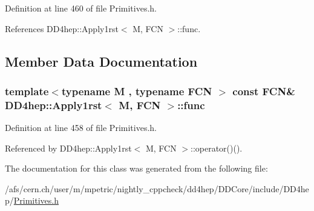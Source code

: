 Definition at line 460 of file Primitives.h.

References DD4hep::Apply1rst$<$ M, FCN $>$::func.

\subsection{Member Data Documentation}
\hypertarget{class_d_d4hep_1_1_apply1rst_a3e6269941aac554118d47927dcdeba97}{
\subsubsection[{func}]{\setlength{\rightskip}{0pt plus 5cm}template$<$typename M , typename FCN $>$ const FCN\& {\bf DD4hep::Apply1rst}$<$ M, FCN $>$::{\bf func}}}
\label{class_d_d4hep_1_1_apply1rst_a3e6269941aac554118d47927dcdeba97}


Definition at line 458 of file Primitives.h.

Referenced by DD4hep::Apply1rst$<$ M, FCN $>$::operator()().

The documentation for this class was generated from the following file:\begin{DoxyCompactItemize}
\item 
/afs/cern.ch/user/m/mpetric/nightly\_\-cppcheck/dd4hep/DDCore/include/DD4hep/\hyperlink{_primitives_8h}{Primitives.h}\end{DoxyCompactItemize}
